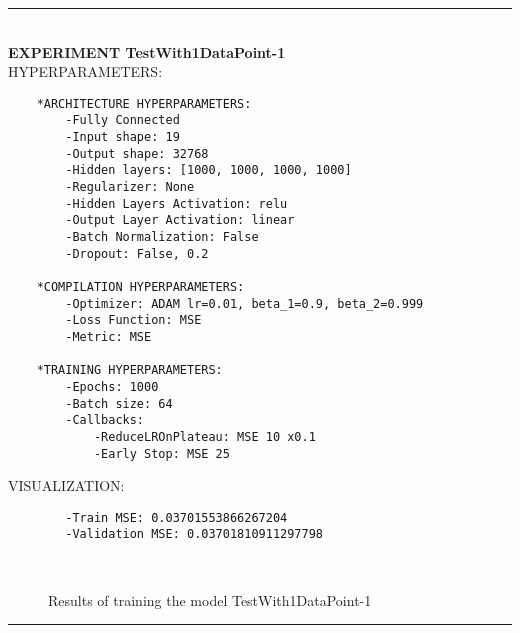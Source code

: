 \rule{0.5\textwidth}{0.5pt}\\

	{\large \textbf{EXPERIMENT TestWith1DataPoint-1}}\\
	
	{\normalsize HYPERPARAMETERS:}
	\begin{lstlisting}
	*ARCHITECTURE HYPERPARAMETERS:
		-Fully Connected
		-Input shape: 19
		-Output shape: 32768
		-Hidden layers: [1000, 1000, 1000, 1000]
		-Regularizer: None
		-Hidden Layers Activation: relu
		-Output Layer Activation: linear
		-Batch Normalization: False
		-Dropout: False, 0.2
	
	*COMPILATION HYPERPARAMETERS:
		-Optimizer: ADAM lr=0.01, beta_1=0.9, beta_2=0.999
		-Loss Function: MSE
		-Metric: MSE
	
	*TRAINING HYPERPARAMETERS:
		-Epochs: 1000
		-Batch size: 64
		-Callbacks: 
			-ReduceLROnPlateau: MSE 10 x0.1
			-Early Stop: MSE 25
	\end{lstlisting}
	
	{\normalsize VISUALIZATION:}
	\begin{lstlisting}
        -Train MSE: 0.03701553866267204
        -Validation MSE: 0.03701810911297798
	\end{lstlisting}
	
	\begin{figure*}[ht!]
		\hspace{\fill}
		\hspace{\fill}	
		\\
		\caption{Results of training the model TestWith1DataPoint-1}
	\end{figure*}
	
\FloatBarrier	
\rule{0.5\textwidth}{0.5pt}\\